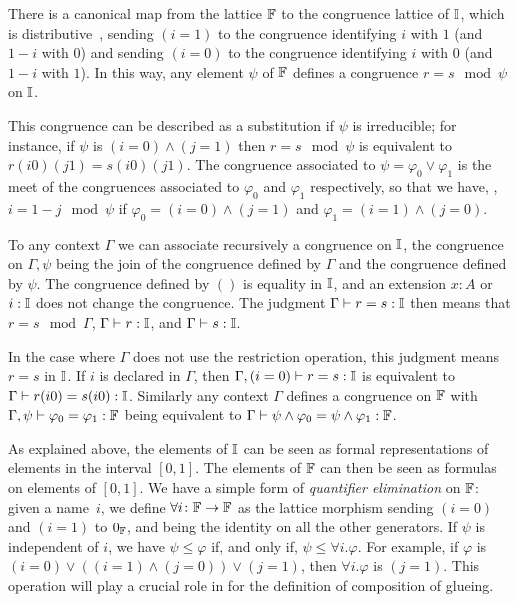 %
There is a canonical map from the lattice $\mathbb{F}$ to the congruence
lattice of $\mathbb{I}$, which is distributive~\cite{Balbes}, sending $(i=1)$ to the congruence
identifying $i$ with $1$ (and $1-i$ with $0$) and sending $(i=0)$ to
the congruence identifying $i$ with $0$ (and $1-i$ with $1$). In this
way, any element $\psi$ of $\mathbb{F}$ defines a congruence
$r = s \mod{\psi}$ on $\mathbb{I}$.

\medskip

This congruence can be described as a substitution if $\psi$ is
irreducible; for instance, if $\psi$ is $(i=0) \wedge (j=1)$ then
$r = s \mod{\psi}$ is equivalent to $r(i0)(j1) = s(i0)(j1)$. The
congruence associated to $\psi = \varphi_0 \vee \varphi_1$ is the meet
of the congruences associated to $\varphi_0$ and $\varphi_1$
respectively, so that we have, \eg{}, $i = 1-j \mod{\psi}$ if
$\varphi_0 = (i=0) \wedge (j=1)$ and $\varphi_1 = (i=1) \wedge (j=0)$.

\medskip

To any context $\Gamma$ we can associate recursively a congruence on
$\mathbb{I}$, the congruence on $\Gamma,\psi$ being the join of the
congruence defined by $\Gamma$ and the congruence defined by $\psi$.
The congruence defined by $()$ is equality in $\mathbb{I}$, and an extension
$x:A$ or $i:\mathbb{I}$ does not change the congruence.  The judgment $\Gamma
\vdash r = s : \mathbb{I}$ then means that $r = s \mod{\Gamma}$, $\Gamma \vdash r
: \mathbb{I}$, and $\Gamma \vdash s : \mathbb{I}$.

In the case where $\Gamma$ does not use the restriction operation, this judgment
means $r = s$ in $\mathbb{I}$. If $i$ is declared in $\Gamma$, then
$\Gamma,(i=0) \vdash r = s : \mathbb{I}$ is equivalent to
$\Gamma \vdash r(i0) = s(i0) : \mathbb{I}$. Similarly any context $\Gamma$
defines a congruence on $\mathbb{F}$ with
$\Gamma,\psi \vdash \varphi_0 = \varphi_1 : \mathbb{F}$ being equivalent to
$\Gamma \vdash \psi \wedge \varphi_0 = \psi \wedge \varphi_1 : \mathbb{F}$.

\medskip

As explained above, the elements of $\mathbb{I}$ can be seen as formal
representations of elements in the interval $[0,1]$. The elements of
$\mathbb{F}$ can then be seen as formulas on elements of $[0,1]$.  We have a
simple form of {\em quantifier elimination} on $\mathbb{F}$: given a
name~$i$, we define $\forall i \colon \mathbb{F} \to \mathbb{F}$ as the lattice
morphism sending $(i=0)$ and $(i=1)$ to $0_{\mathbb{F}}$, and being the
identity on all the other generators.  If $\psi$ is independent of
$i$, we have $\psi \leqslant \varphi$ if, and only if, $\psi \leqslant
\forall i. \varphi$.  For example, if $\varphi$ is $(i=0) \vee
((i=1)\wedge (j=0))\vee (j=1)$, then $\forall i.\varphi$ is $(j=1)$.
This operation will play a crucial role in
 for the definition of composition of
glueing.


